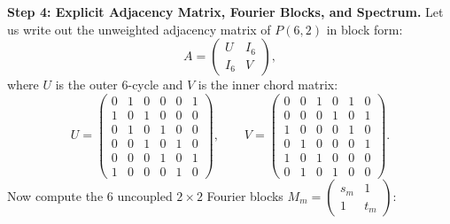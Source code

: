 \documentclass[11pt]{article}
\begin{document}
\noindent\textbf{Step 4: Explicit Adjacency Matrix, Fourier Blocks, and Spectrum.}
Let us write out the unweighted adjacency matrix of $P(6,2)$ in block form:
\begin{equation}
  A = \begin{pmatrix} U & I_6 \\ I_6 & V \end{pmatrix},
\end{equation}
where $U$ is the outer 6-cycle and $V$ is the inner chord matrix:
\begin{equation}
  U = \begin{pmatrix}
    0 & 1 & 0 & 0 & 0 & 1 \\
    1 & 0 & 1 & 0 & 0 & 0 \\
    0 & 1 & 0 & 1 & 0 & 0 \\
    0 & 0 & 1 & 0 & 1 & 0 \\
    0 & 0 & 0 & 1 & 0 & 1 \\
    1 & 0 & 0 & 0 & 1 & 0
  \end{pmatrix}, \qquad
  V = \begin{pmatrix}
    0 & 0 & 1 & 0 & 1 & 0 \\
    0 & 0 & 0 & 1 & 0 & 1 \\
    1 & 0 & 0 & 0 & 1 & 0 \\
    0 & 1 & 0 & 0 & 0 & 1 \\
    1 & 0 & 1 & 0 & 0 & 0 \\
    0 & 1 & 0 & 1 & 0 & 0
  \end{pmatrix}.
\end{equation}
Now compute the 6 uncoupled $2 \times 2$ Fourier blocks $M_m = \begin{pmatrix} s_m & 1 \\ 1 & t_m \end{pmatrix}$:
\end{document}
